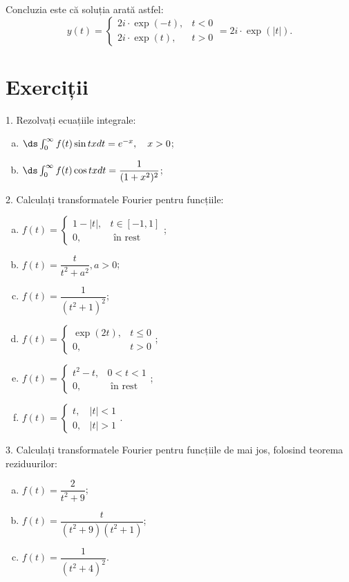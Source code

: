 Concluzia este că soluția arată astfel:
\[
    y(t) = \begin{cases}
        2i \cdot \exp(-t), & t < 0 \\
        2i \cdot \exp(t), & t > 0
    \end{cases} = 2i \cdot \exp\left( |t| \right).  
\]


\section{Exerciții}

1. Rezolvați ecuațiile integrale:
\begin{enumerate}[(a)]
    \item $ \ds\int_0^\infty f(t) \sin tx dt = e^{-x}, \quad x > 0 $;
    \item $ \ds\int_0^\infty f(t) \cos tx dt = \dfrac{1}{(1 + x^2)^2} $;
\end{enumerate}

\vspace{0.3cm}

2. Calculați transformatele Fourier pentru funcțiile:
\begin{enumerate}[(a)]
    \item $ f(t) = \begin{cases} 1 - |t|, & t \in [-1, 1] \\ 0, & \text{ în rest} \end{cases} $;
    \item $ f(t) = \dfrac{t}{t^2 + a^2}, a > 0 $;
    \item $ f(t) = \dfrac{1}{(t^2 + 1)^2} $;
    \item $ f(t) = \begin{cases} \exp(2t), & t \leq 0 \\ 0, & t > 0 \end{cases} $;
    \item $ f(t) = \begin{cases} t^2 - t, & 0 < t < 1 \\ 0, & \text{ în rest} \end{cases} $;
    \item $ f(t) = \begin{cases} t, & |t| < 1 \\ 0, & |t| > 1 \end{cases} $.
\end{enumerate}

\vspace{0.3cm}

3. Calculați transformatele Fourier pentru funcțiile de mai jos,
folosind teorema reziduurilor:
\begin{enumerate}[(a)]
    \item $ f(t) = \dfrac{2}{t^2 + 9} $;
    \item $ f(t) = \dfrac{t}{(t^2 + 9)(t^2 + 1)} $;
    \item $ f(t) = \dfrac{1}{(t^2 + 4)^2} $.
\end{enumerate}
